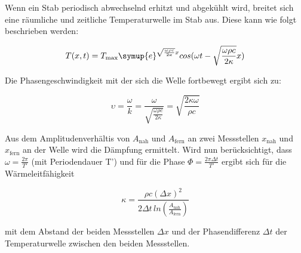       \noindent Wenn ein Stab periodisch abwechselnd erhitzt und abgekühlt wird, breitet sich eine räumliche und zeitliche Temperaturwelle im Stab aus. 
      Diese kann wie folgt beschrieben werden: 

      \begin{equation*}
      T(x,t) = T_\text{max} \symup{e}^{\sqrt{\frac{\omega \rho c}{2 \kappa}}x} cos(\omega t - \sqrt{\frac{\omega \rho c}{2 \kappa}} x)
        \label{eqn:temperaturwelle}
      \end{equation*}  

      \noindent Die Phasengeschwindigkeit mit der sich die Welle fortbewegt ergibt sich zu:

      \begin{equation}
      \upsilon = \frac{\omega}{k} = \frac{\omega}{\sqrt{\frac{\omega \rho c}{2 \kappa}}} = \sqrt{\frac{2 \kappa \omega}{\rho c}}
        \label{eqn:phasengeschwindigkeit}
      \end{equation}

      \noindent Aus dem Amplitudenverhältis von $A_\text{nah}$ und $A_\text{fern}$ an zwei Messstellen $x_\text{nah}$ und $x_\text{fern}$ an der Welle wird die Dämpfung ermittelt.
      Wird nun berücksichtigt, dass $\omega = \frac{2 \pi}{T'}$ (mit Periodendauer T') und für die Phase $\Phi = \frac{2 \pi \Delta t}{T'}$ ergibt sich für die Wärmeleitfähigkeit

      \begin{equation}
      \kappa = \frac{\rho c (\Delta x)^2}{2 \Delta t \, ln (\frac{A_\text{nah}}{A_\text{fern}})}
        \label{eqn:waermeleitfaehigkeit}
      \end{equation}

     \noindent mit dem Abstand der beiden Messstellen $\Delta x$ und der Phasendifferenz $\Delta t$ der Temperaturwelle zwischen den beiden Messstellen.